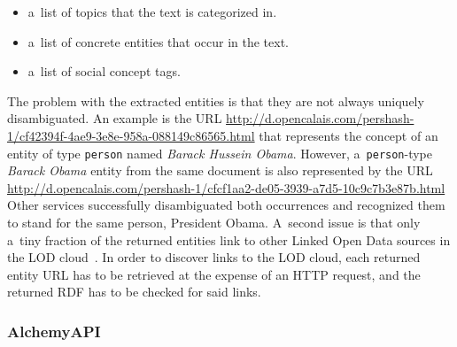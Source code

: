 \begin{itemize}
  \item a~list of topics that the text is categorized in.
  \item a~list of concrete entities that occur in the text.
  \item a~list of social concept tags.
\end{itemize}

The problem with the extracted entities is
that they are not always uniquely disambiguated.
An example is the URL \url{http://d.opencalais.com/pershash-1/cf42394f-4ae9-3e8e-958a-088149c86565.html}
that represents the concept of an entity of type \texttt{person}
named \emph{Barack Hussein Obama}.
However, a~\texttt{person}-type \emph{Barack Obama} entity from the same document is also represented by the URL
\url{http://d.opencalais.com/pershash-1/cfcf1aa2-de05-3939-a7d5-10c9c7b3e87b.html}
Other services successfully disambiguated both occurrences and
recognized them to stand for the same person, President Obama.
A~second issue is that only a~tiny fraction of the returned
entities link to other Linked Open Data sources in the
LOD cloud~\cite{bizer2011statelodcloud,cyganiak2011lodcloud}.
In order to discover links to the LOD cloud,
each returned entity URL has to be retrieved at the expense
of an HTTP request, and the returned RDF has to be checked
for said links.

\subsubsection{AlchemyAPI}

